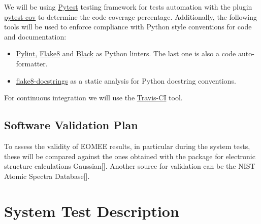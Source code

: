 \documentclass[12pt, titlepage]{article}
\begin{document}
We will be using \href{https://docs.pytest.org/en/stable/} 
{Pytest} testing framework for tests automation  with the plugin 
\href{https://pytest-cov.readthedocs.io/en/latest/} {pytest-cov} to 
determine the code coverage percentage. Additionally, the following tools 
will be 
used to enforce compliance with Python style 
conventions for code and documentation:
\begin{itemize}
\item \href{https://www.pylint.org/} {Pylint}, 
\href{https://flake8.pycqa.org/en/latest/} {Flake8} and 
\href{https://black.readthedocs.io/en/stable/#} {Black} as Python linters. The 
last one is also a code auto-formatter. 
\item \href{https://pypi.org/project/flake8-docstrings/} {flake8-docstrings} as 
a static analysis for Python docstring conventions.
\end{itemize}
For continuous integration we will use the \href{https://travis-ci.org/} 
{Travis-CI} tool.

\subsection{Software Validation Plan}

To assess the validity of EOMEE results, in particular during the system tests, 
these will be compared against the ones obtained with the package for 
electronic structure calculations Gaussian[\cite{g16}]. Another source for 
validation can be the NIST Atomic Spectra 
Database[\cite{NIST_ASD}].

\section{System Test Description}
\label{section:systemtests}
	
\end{document}
